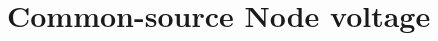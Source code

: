 \documentclass{article}
\begin{document}
\section*{Common-source Node voltage}






\end{document}
